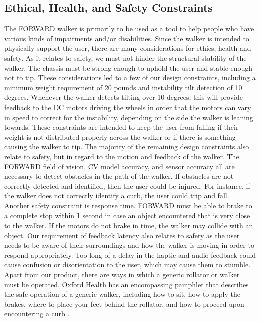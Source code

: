 \subsection{Ethical, Health, and Safety Constraints}
\noindent The FORWARD walker is primarily to be used as a tool to help people who have various kinds of impairments and/or disabilities. Since the walker is intended to physically support the user, there are many considerations for ethics, health and safety. As it relates to safety, we must not hinder the structural stability of the walker. The chassis must be strong enough to uphold the user and stable enough not to tip. These considerations led to a few of our design constraints, including a minimum weight requirement of 20 pounds and instability tilt detection of 10 degrees. Whenever the walker detects tilting over 10 degrees, this will provide feedback to the DC motors driving the wheels in order that the motors can vary in speed to correct for the instability, depending on the side the walker is leaning towards. These constraints are intended to keep the user from falling if their weight is not distributed properly across the walker or if there is something causing the walker to tip. The majority of the remaining design constraints also relate to safety, but in regard to the motion and feedback of the walker. The FORWARD field of vision, CV model accuracy, and sensor accuracy all are necessary to detect obstacles in the path of the walker. If obstacles are not correctly detected and identified, then the user could be injured. For instance, if the walker does not correctly identify a curb, the user could trip and fall. Another safety constraint is response time. FORWARD must be able to brake to a complete stop within 1 second in case an object encountered that is very close to the walker. If the motors do not brake in time, the walker may collide with an object. Our requirement of feedback latency also relates to safety as the user needs to be aware of their surroundings and how the walker is moving in order to respond appropriately. Too long of a delay in the haptic and audio feedback could cause confusion or disorientation to the user, which may cause them to stumble. Apart from our product, there are ways in which a generic rollator or walker must be operated. Oxford Health has an encompassing pamphlet that describes the safe operation of a generic walker, including how to sit, how to apply the brakes, where to place your feet behind the rollator, and how to proceed upon encountering a curb \cite{oxford_health_2014}.\\

